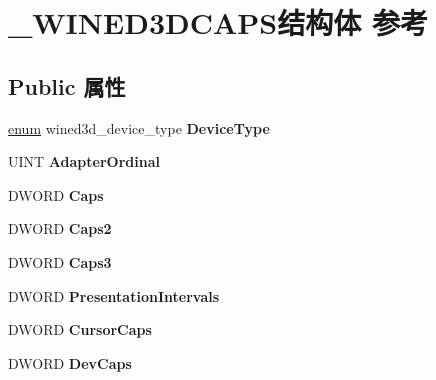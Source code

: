 \hypertarget{struct___w_i_n_e_d3_d_c_a_p_s}{}\section{\+\_\+\+W\+I\+N\+E\+D3\+D\+C\+A\+P\+S结构体 参考}
\label{struct___w_i_n_e_d3_d_c_a_p_s}
\subsection*{Public 属性}
\begin{DoxyCompactItemize}
\item 
\mbox{\label{struct___w_i_n_e_d3_d_c_a_p_s_ad10b51424f949c3ca1688df042c58278}} 
\hyperlink{interfaceenum}{enum} wined3d\+\_\+device\+\_\+type {\bfseries Device\+Type}
\item 
\mbox{\label{struct___w_i_n_e_d3_d_c_a_p_s_aa6014d07c9e7aaaabe25ffad84939d02}} 
U\+I\+NT {\bfseries Adapter\+Ordinal}
\item 
\mbox{\label{struct___w_i_n_e_d3_d_c_a_p_s_a8c66e68987cca065a52f463e8c76144e}} 
D\+W\+O\+RD {\bfseries Caps}
\item 
\mbox{\label{struct___w_i_n_e_d3_d_c_a_p_s_af660e5beb911292703dff74a454f946b}} 
D\+W\+O\+RD {\bfseries Caps2}
\item 
\mbox{\label{struct___w_i_n_e_d3_d_c_a_p_s_ac318facce463827341f5efbd3976dee5}} 
D\+W\+O\+RD {\bfseries Caps3}
\item 
\mbox{\label{struct___w_i_n_e_d3_d_c_a_p_s_ae0a609ee298ad5012cb2174161c7ec0b}} 
D\+W\+O\+RD {\bfseries Presentation\+Intervals}
\item 
\mbox{\label{struct___w_i_n_e_d3_d_c_a_p_s_a1114532bb38c1e0979782239d36b774e}} 
D\+W\+O\+RD {\bfseries Cursor\+Caps}
\item 
\mbox{\label{struct___w_i_n_e_d3_d_c_a_p_s_a00b7cfe396af12ca40ad52f393944d32}} 
D\+W\+O\+RD {\bfseries Dev\+Caps}

\end{DoxyCompactItemize}
